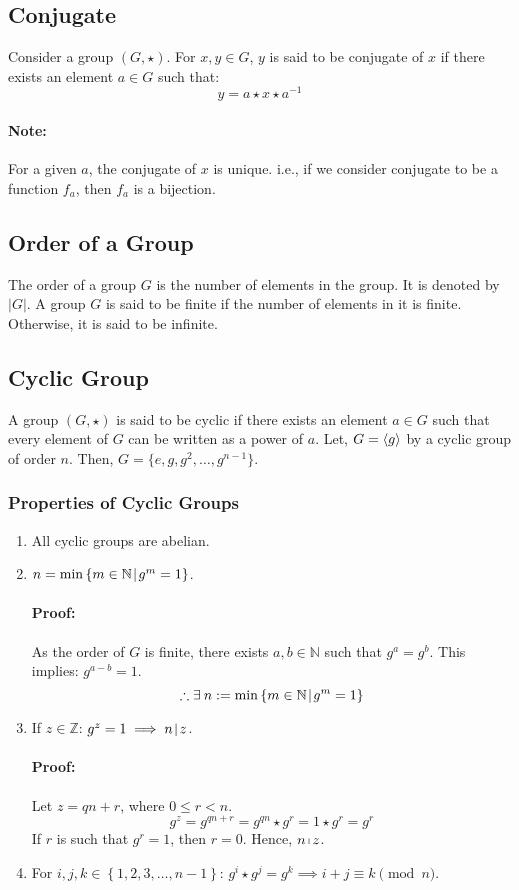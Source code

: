 \documentclass[12pt, oneside]{book}
\DeclarePairedDelimiter{\evdel}{\langle}{\rangle}
\newcommand{\ev}{\evdel}
\begin{document}
\subsection{Conjugate}
Consider a group \( \left(G, \star \right) \).
For \(x,y \in G\), \(y\) is said to be conjugate of \(x\) if there exists an element \(a \in G\) such that:
\[ y = a \star x \star a^{-1} \]
\paragraph{Note:} For a given \(a\), the conjugate of \(x\) is unique.
i.e., if we consider conjugate to be a function \(f_a\), then \(f_a\) is a bijection.

\subsection{Order of a Group}
The order of a group \(G\) is the number of elements in the group.
It is denoted by \(|G|\).
A group \(G\) is said to be finite if the number of elements in it is finite.
Otherwise, it is said to be infinite.

\subsection{Cyclic Group}
A group \( \left(G, \star \right) \) is said to be cyclic if there exists an element \(a \in G\) such that every element of \(G\) can be written as a power of \(a\).
Let, \(G = \ev{g}\) by a cyclic group of order \(n\).
Then, \(G = \{e, g, g^2, \ldots, g^{n-1}\}\).
\subsubsection{Properties of Cyclic Groups}
\begin{enumerate}
    \item All cyclic groups are abelian.
    \item \(n = \min{ \left\{m \in \mathbb{N} \: \vline \: g^m = 1\right\} }\).

    \paragraph{Proof:} As the order of \(G\) is finite, there exists \(a,b \in \mathbb{N}\) such that \(g^a = g^b\). 
    This implies: \(g^{a-b} = 1\).
    \[ \therefore \exists \: n := \min{ \left\{m \in \mathbb{N} \: \vline \: g^m = 1\right\} } \]

    \item If \(z \in \mathbb{Z}\): \(g^z = 1 \implies n \: \vline \: z \).
    \paragraph{Proof:} Let \(z = qn + r\), where \(0 \leq r < n\).
    \[ g^z = g^{qn+r} = g^{qn} \star g^r = 1 \star g^r = g^r \]
    If \(r\) is such that \(g^r = 1\), then \(r = 0\).
    Hence, \(n \: \vline \: z\).
    \item For \(i,j,k \in \left\{1,2,3,\dots,n-1\right\}\): \(g^i \star g^j = g^k \implies i+j \equiv k \pmod{n}\).
\end{enumerate}
\end{document}
